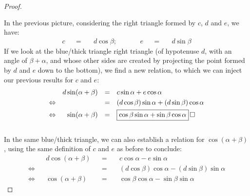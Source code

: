 \documentclass[solutions.tex]{subfiles}
\renewcommand{\bm}[1]{\pmb{#1}}
\renewcommand{\qed}{\,\relax\ifmmode\Box\else$\Box$\fi}
\begin{document}
\begin{proof}
\begin{figure}[H]
\end{figure}
In the previous picture, considering the right triangle formed by $c$, $d$
and $e$, we have:
\begin{equation*} \begin{aligned}
	c &&=\quad& d\cos\beta; &&\quad& e &&=\quad& d\sin\beta
\end{aligned} \end{equation*}
If we look at the blue/thick triangle right triangle (of hypotenuse
$d$, with an angle of $\beta+\alpha$, and whose other sides are
created by projecting the point formed by $d$ and $e$ down to the
bottom), we find a new relation, to which we can inject our previous
results for $c$ and $e$:
\begin{equation*} \begin{aligned}
	~ && d\sin(\alpha+\beta) &&=\quad& c\sin\alpha+e\cos\alpha \\
	\Leftrightarrow && ~ &&=\quad& (d\cos\beta)\sin\alpha+(d\sin\beta)\cos\alpha \\
	\Leftrightarrow && \sin(\alpha+\beta) &&=\quad& \boxed{\cos\beta\sin\alpha+\sin\beta\cos\alpha}\qed
\end{aligned} \end{equation*}\\
In the same blue/thick triangle, we can also establish a relation
for $\cos(\alpha+\beta)$, using the same definition of $c$ and $e$
as before to conclude:
\begin{equation*} \begin{aligned}
	~ && d\cos(\alpha+\beta) &&=\quad& c\cos\alpha-e\sin\alpha \\
	\Leftrightarrow && ~ &&=\quad& (d\cos\beta)\cos\alpha-(d\sin\beta)\sin\alpha \\
	\Leftrightarrow && \cos(\alpha+\beta) &&=\quad& \boxed{\cos\beta\cos\alpha-\sin\beta\sin\alpha}
\end{aligned} \end{equation*}

\end{proof}
\end{document}
